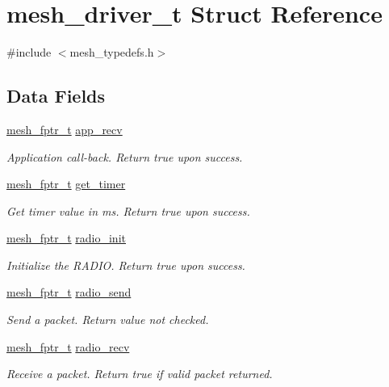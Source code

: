 \hypertarget{structmesh__driver__t}{}\section{mesh\+\_\+driver\+\_\+t Struct Reference}
\label{structmesh__driver__t}


{\ttfamily \#include $<$mesh\+\_\+typedefs.\+h$>$}

\subsection*{Data Fields}
\begin{DoxyCompactItemize}
\item 
\hyperlink{mesh__typedefs_8h_aa10eac776a3b3e493f11e01c474d431f}{mesh\+\_\+fptr\+\_\+t} \hyperlink{structmesh__driver__t_a8b1713e38a869bcd8c0e9f4fc139e5bd}{app\+\_\+recv}
\begin{DoxyCompactList}\small\item\em Application call-\/back. Return true upon success. \end{DoxyCompactList}\item 
\hyperlink{mesh__typedefs_8h_aa10eac776a3b3e493f11e01c474d431f}{mesh\+\_\+fptr\+\_\+t} \hyperlink{structmesh__driver__t_a2bd99112f2188d5129974939d6a1bae0}{get\+\_\+timer}
\begin{DoxyCompactList}\small\item\em Get timer value in ms. Return true upon success. \end{DoxyCompactList}\item 
\hyperlink{mesh__typedefs_8h_aa10eac776a3b3e493f11e01c474d431f}{mesh\+\_\+fptr\+\_\+t} \hyperlink{structmesh__driver__t_a33b6b9bf00488248cd33d17129f74bc4}{radio\+\_\+init}
\begin{DoxyCompactList}\small\item\em Initialize the R\+A\+D\+IO. Return true upon success. \end{DoxyCompactList}\item 
\hyperlink{mesh__typedefs_8h_aa10eac776a3b3e493f11e01c474d431f}{mesh\+\_\+fptr\+\_\+t} \hyperlink{structmesh__driver__t_a5516b86cc03fcc2512b04d9978645c69}{radio\+\_\+send}
\begin{DoxyCompactList}\small\item\em Send a packet. Return value not checked. \end{DoxyCompactList}\item 
\hyperlink{mesh__typedefs_8h_aa10eac776a3b3e493f11e01c474d431f}{mesh\+\_\+fptr\+\_\+t} \hyperlink{structmesh__driver__t_abd2f06c3ce4baa0c735629e9df295b3f}{radio\+\_\+recv}
\begin{DoxyCompactList}\small\item\em Receive a packet. Return true if valid packet returned. \end{DoxyCompactList}\end{DoxyCompactItemize}


